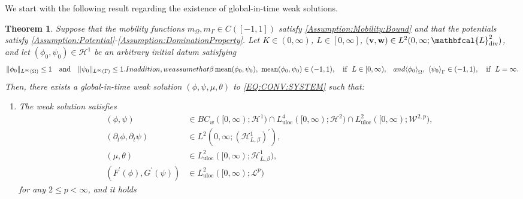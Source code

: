 \documentclass[10pt,reqno]{amsart}
\newtheorem{theorem}{Theorem}[section]
\theoremstyle{remark}
\numberwithin{equation}{section}
\newcommand{\norm}[1]{\| #1 \|}
\newcommand{\scp}[2]{ ( #1 , #2  )}
\newcommand{\meano}[1]{{\langle #1 \rangle}_{\Omega}}
\newcommand{\meang}[1]{{\langle #1 \rangle}_{\Gamma}}
\newcommand{\mean}[2]{\textnormal{mean}\scp{#1}{#2}}
\newcommand{\bv}{\mathbf{v}}
\newcommand{\bw}{\mathbf{w}}
\newcommand{\delt}{\partial_{t}}
\newcommand{\Div}{\textnormal{div}}
\newcommand{\Om}{\Omega}
\newcommand{\Ga}{\Gamma}
\begin{document}
We start with the following result regarding the existence of global-in-time weak solutions.
\begin{theorem}\label{Theorem:CCH:Existence}
    Suppose that the mobility functions $m_\Om, m_\Ga\in C([-1,1])$ satisfy \ref{Assumption:Mobility:Bound} and that the potentials satisfy \ref{Assumption:Potential}-\eqref{Assumption:DominationProperty}. Let $K\in(0,\infty)$, $L\in[0,\infty]$, $(\bv,\bw)\in L^2(0,\infty;\mathbfcal{L}^2_\Div)$, and let $(\phi_0,\psi_0)\in\mathcal{H}^1$ be an arbitrary initial datum satisfying
    \begin{subequations}\label{cond:init}
        \begin{align}\label{cond:init:int}
            \norm{\phi_0}_{L^\infty(\Om)} \leq 1 \quad\text{and}\quad \norm{\psi_0}_{L^\infty(\Ga)} \leq 1.
        \end{align}
        In addition, we assume that
        \begin{align}\label{cond:init:mean:L}
            &\beta\,\mean{\phi_0}{\psi_0},\ \mean{\phi_0}{\psi_0}\in(-1,1), \quad \text{if~ }L\in[0,\infty),
        \end{align}
        and 
        \begin{align}\label{cond:init:mean:inf}
            \meano{\phi_0},\ \meang{\psi_0}\in(-1,1), \quad \text{if~ }L=\infty.
        \end{align}
    \end{subequations}
    Then, there exists a global-in-time weak solution $(\phi,\psi,\mu,\theta)$ to \eqref{EQ:CONV:SYSTEM} such that:
    \begin{enumerate}[label=\textnormal{(\roman*)}, topsep=0ex, leftmargin=*, itemsep=1.5ex]
        \item \label{CCH:WS:Reg} The weak solution satisfies
        \begin{align*}
            (\phi,\psi)&\in BC_w([0,\infty);\mathcal{H}^1)\cap L^4_{\mathrm{uloc}}([0,\infty);\mathcal{H}^2)\cap L^2_{\mathrm{uloc}}([0,\infty);\mathcal{W}^{2,p}), \\
            (\delt\phi,\delt\psi)&\in L^2(0,\infty;(\mathcal{H}^1_{L,\beta})^\prime), \\
            (\mu,\theta)&\in L^2_{\mathrm{uloc}}([0,\infty);\mathcal{H}^1_{L,\beta}), \\
            (F^\prime(\phi),G^\prime(\psi))&\in L^2_{\mathrm{uloc}}([0,\infty);\mathcal{L}^p)
        \end{align*}
        for any $2 \leq p < \infty$, and it holds
        \begin{align}\label{CCH:pp:<1}

\end{align}
\end{enumerate}
\end{theorem}
\end{document}
